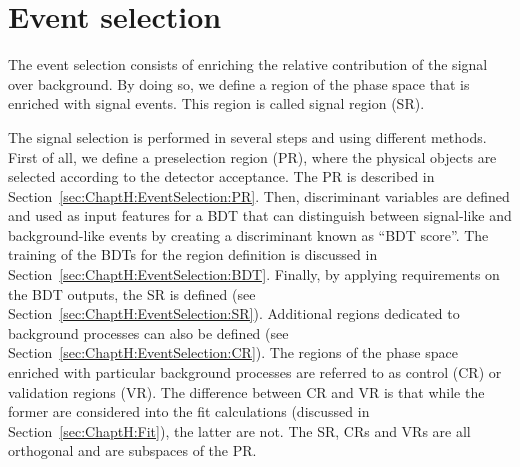 


\section{Event selection}
\label{sec:ChaptH:EventSelection}
The event selection consists of enriching the relative contribution of the
signal over background. %
By doing so, we define a region of the phase space 
that is enriched with signal events. This region is called 
signal region (SR).


The signal selection is performed in several steps and using different methods. First of all, we define a 
preselection region (PR), where the physical objects are selected according to the detector acceptance.
The PR is described in Section~\ref{sec:ChaptH:EventSelection:PR}.
Then, discriminant variables are defined and used as input features for a BDT that  
can distinguish between signal-like and background-like events by creating a discriminant 
known as ``BDT score''. 
The training of the BDTs for the region definition is discussed in 
Section~\ref{sec:ChaptH:EventSelection:BDT}.
Finally, by applying requirements on the BDT outputs, the SR is 
defined (see Section~\ref{sec:ChaptH:EventSelection:SR}).
 Additional regions dedicated to background processes
can also be defined (see Section~\ref{sec:ChaptH:EventSelection:CR}). 
The regions of the phase space enriched with
particular background processes are referred to as control (CR)
or validation regions (VR). 
The difference between CR and VR is that while the former
are considered into the fit calculations (discussed in Section~\ref{sec:ChaptH:Fit}), the latter are not.
The SR, CRs and VRs are all orthogonal and are subspaces of the PR.



